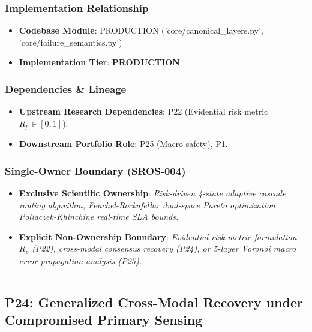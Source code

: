\documentclass[11pt,letterpaper]{article}
\begin{document}
\subsubsection{Implementation Relationship}
\begin{itemize}[leftmargin=*]
    \item \raggedright \textbf{Codebase Module}: PRODUCTION ('core/\allowbreak canonical\_\allowbreak layers.py', 'core/\allowbreak failure\_\allowbreak semantics.py')
    \item \textbf{Implementation Tier}: \textbf{PRODUCTION}
\end{itemize}

\subsubsection{Dependencies \& Lineage}
\begin{itemize}[leftmargin=*]
    \item \textbf{Upstream Research Dependencies}: P22 (Evidential risk metric $R_p \in [0, 1]$).
    \item \textbf{Downstream Portfolio Role}: P25 (Macro safety), P1.
\end{itemize}

\subsubsection{Single-Owner Boundary (SROS-004)}
\begin{itemize}[leftmargin=*]
    \item \textbf{Exclusive Scientific Ownership}: \textit{Risk-\allowbreak driven 4-\allowbreak state adaptive cascade routing algorithm, Fenchel-\allowbreak Rockafellar dual-\allowbreak space Pareto optimization, Pollaczek-\allowbreak Khinchine real-\allowbreak time SLA bounds.}
    \item \textbf{Explicit Non-Ownership Boundary}: \textit{Evidential risk metric formulation $R_p$ (P22), cross-\allowbreak modal consensus recovery (P24), or 5-\allowbreak layer Voronoi macro error propagation analysis (P25).}
\end{itemize}

\vspace{0.4cm}
\hrule

\subsection{P24: Generalized Cross-\allowbreak Modal Recovery under Compromised Primary Sensing}
\label{sec:profile_p24}
\end{document}
